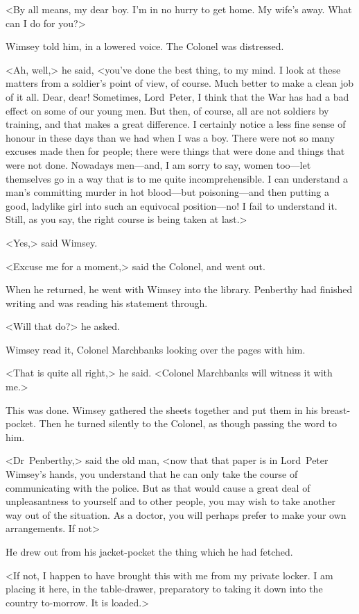 <By all means, my dear boy. I'm in no hurry to get home. My wife's away. What can I do for you?>

Wimsey told him, in a lowered voice. The Colonel was distressed.

<Ah, well,> he said, <you've done the best thing, to my mind. I look at these matters from a soldier's point of view, of course. Much better to make a clean job of it all. Dear, dear! Sometimes, Lord~Peter, I think that the War has had a bad effect on some of our young men. But then, of course, all are not soldiers by training, and that makes a great difference. I certainly notice a less fine sense of honour in these days than we had when I was a boy. There were not so many excuses made then for people; there were things that were done and things that were not done. Nowadays men—and, I am sorry to say, women too—let themselves go in a way that is to me quite incomprehensible. I can understand a man's committing murder in hot blood—but poisoning—and then putting a good, ladylike girl into such an equivocal position—no! I fail to understand it. Still, as you say, the right course is being taken at last.>

<Yes,> said Wimsey.

<Excuse me for a moment,> said the Colonel, and went out.

When he returned, he went with Wimsey into the library. Penberthy had finished writing and was reading his statement through.

<Will that do?> he asked.

Wimsey read it, Colonel Marchbanks looking over the pages with him.

<That is quite all right,> he said. <Colonel Marchbanks will witness it with me.>

This was done. Wimsey gathered the sheets together and put them in his breast-pocket. Then he turned silently to the Colonel, as though passing the word to him.

<Dr~Penberthy,> said the old man, <now that that paper is in Lord~Peter Wimsey's hands, you understand that he can only take the course of communicating with the police. But as that would cause a great deal of unpleasantness to yourself and to other people, you may wish to take another way out of the situation. As a doctor, you will perhaps prefer to make your own arrangements. If not\longdash>

He drew out from his jacket-pocket the thing which he had fetched.

<If not, I happen to have brought this with me from my private locker. I am placing it here, in the table-drawer, preparatory to taking it down into the country to-morrow. It is loaded.>

